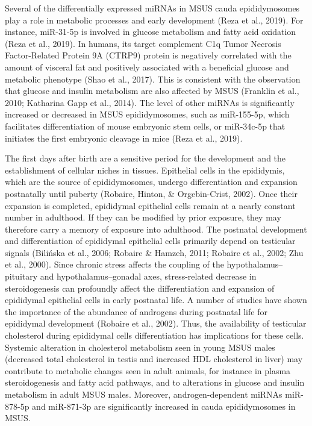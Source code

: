 \documentclass[12pt,twoside]{reedthesis}
\begin{document}
Several of the differentially expressed miRNAs in MSUS cauda epididymosomes play a role in metabolic processes and early development (Reza et al., 2019). For instance, miR-31-5p is involved in glucose metabolism and fatty acid oxidation (Reza et al., 2019). In humans, its target complement C1q Tumor Necrosis Factor-Related Protein 9A (CTRP9) protein is negatively correlated with the amount of visceral fat and positively associated with a beneficial glucose and metabolic phenotype (Shao et al., 2017). This is consistent with the observation that glucose and insulin metabolism are also affected by MSUS (Franklin et al., 2010; Katharina Gapp et al., 2014). The level of other miRNAs is significantly increased or decreased in MSUS epididymosomes, such as miR-155-5p, which facilitates differentiation of mouse embryonic stem cells, or miR-34c-5p that initiates the first embryonic cleavage in mice (Reza et al., 2019).

The first days after birth are a sensitive period for the development and the establishment of cellular niches in tissues. Epithelial cells in the epididymis, which are the source of epididymosomes, undergo differentiation and expansion postnatally until puberty (Robaire, Hinton, \& Orgebin-Crist, 2002). Once their expansion is completed, epididymal epithelial cells remain at a nearly constant number in adulthood. If they can be modified by prior exposure, they may therefore carry a memory of exposure into adulthood. The postnatal development and differentiation of epididymal epithelial cells primarily depend on testicular signals (Bilińska et al., 2006; Robaire \& Hamzeh, 2011; Robaire et al., 2002; Zhu et al., 2000). Since chronic stress affects the coupling of the hypothalamus--pituitary and hypothalamus--gonadal axes, stress-related decrease in steroidogenesis can profoundly affect the differentiation and expansion of epididymal epithelial cells in early postnatal life. A number of studies have shown the importance of the abundance of androgens during postnatal life for epididymal development (Robaire et al., 2002). Thus, the availability of testicular cholesterol during epididymal cells differentiation has implications for these cells. Systemic alteration in cholesterol metabolism seen in young MSUS males (decreased total cholesterol in testis and increased HDL cholesterol in liver) may contribute to metabolic changes seen in adult animals, for instance in plasma steroidogenesis and fatty acid pathways, and to alterations in glucose and insulin metabolism in adult MSUS males. Moreover, androgen-dependent miRNAs miR-878-5p and miR-871-3p are significantly increased in cauda epididymosomes in MSUS.
\end{document}
